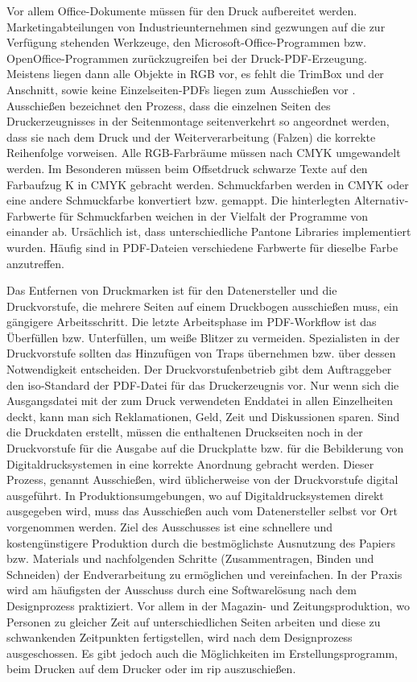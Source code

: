 Vor allem Office-Dokumente müssen für den Druck aufbereitet werden. Marketingabteilungen von Industrieunternehmen sind gezwungen auf die zur Verfügung stehenden Werkzeuge, den Microsoft-Office-Programmen bzw. OpenOffice-Programmen zurückzugreifen bei der Druck-PDF-Erzeugung. Meistens liegen dann alle Objekte in RGB vor, es fehlt die TrimBox und der Anschnitt, sowie keine Einzelseiten-PDFs liegen zum Ausschießen vor \cite{schneeberger}. Ausschießen bezeichnet den Prozess, dass die einzelnen Seiten des Druckerzeugnisses in der Seitenmontage seitenverkehrt so angeordnet werden, dass sie nach dem Druck und der Weiterverarbeitung (Falzen) die korrekte Reihenfolge vorweisen. \cite{kompendium} Alle RGB-Farbräume müssen nach CMYK umgewandelt werden. Im Besonderen müssen beim Offsetdruck schwarze Texte auf den Farbaufzug K in CMYK gebracht werden. Schmuckfarben werden in CMYK oder eine andere Schmuckfarbe konvertiert bzw. gemappt. Die hinterlegten Alternativ-Farbwerte für Schmuckfarben weichen in der Vielfalt der Programme von einander ab. Ursächlich ist, dass unterschiedliche Pantone Libraries implementiert wurden. Häufig sind in PDF-Dateien verschiedene Farbwerte für dieselbe Farbe anzutreffen. 

Das Entfernen von Druckmarken ist für den Datenersteller und die Druckvorstufe, die mehrere Seiten auf einem Druckbogen ausschießen muss, ein gängigere Arbeitsschritt. Die letzte Arbeitsphase im PDF-Workflow ist das Überfüllen bzw. Unterfüllen, um weiße Blitzer zu vermeiden. Spezialisten in der Druckvorstufe sollten das Hinzufügen von Traps übernehmen bzw. über dessen Notwendigkeit entscheiden. Der Druckvorstufenbetrieb gibt dem Auftraggeber den \gls{iso}-Standard der PDF-Datei für das Druckerzeugnis vor. Nur wenn sich die Ausgangsdatei mit der zum Druck verwendeten Enddatei in allen Einzelheiten deckt, kann man sich Reklamationen, Geld, Zeit und Diskussionen sparen. Sind die Druckdaten erstellt, müssen die enthaltenen Druckseiten noch in der Druckvorstufe für die Ausgabe auf die Druckplatte bzw. für die Bebilderung von Digitaldrucksystemen in eine korrekte Anordnung gebracht werden. Dieser Prozess, genannt Ausschießen, wird üblicherweise von der Druckvorstufe digital ausgeführt. In Produktionsumgebungen, wo auf Digitaldrucksystemen direkt ausgegeben wird, muss das Ausschießen auch vom Datenersteller selbst vor Ort vorgenommen werden. Ziel des Ausschusses ist eine schnellere und kostengünstigere Produktion durch die bestmöglichste Ausnutzung des Papiers bzw. Materials und nachfolgenden Schritte (Zusammentragen, Binden und Schneiden) der Endverarbeitung zu ermöglichen und vereinfachen. In der Praxis wird am häufigsten der Ausschuss durch eine Softwarelösung nach dem Designprozess praktiziert. Vor allem in der Magazin- und Zeitungsproduktion, wo Personen zu gleicher Zeit auf unterschiedlichen Seiten arbeiten und diese zu schwankenden Zeitpunkten fertigstellen, wird nach dem Designprozess ausgeschossen. Es gibt jedoch auch die Möglichkeiten im Erstellungsprogramm, beim Drucken auf dem Drucker oder im \gls{rip} auszuschießen.
\cite{schneeberger}

